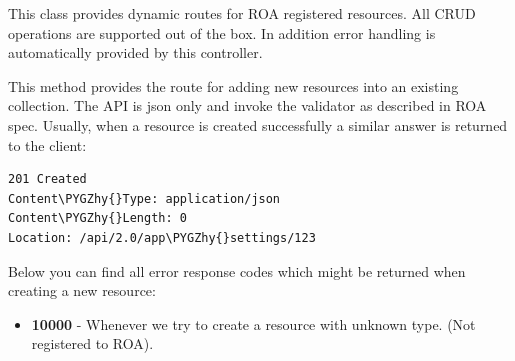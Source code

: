 \documentclass[letterpaper,10pt,english]{sphinxmanual}
\def\PYGZhy{\char`\-}
\begin{document}
\begin{fulllineitems}
\begin{fulllineitems}
\end{fulllineitems}


\end{fulllineitems}


\begin{fulllineitems}
\label{features/roa/technical_summary:fantastico.contrib.roa_discovery.roa_controller.RoaController}
This class provides dynamic routes for ROA registered resources. All CRUD operations are supported out of the box. In
addition error handling is automatically provided by this controller.

\begin{fulllineitems}
\label{features/roa/technical_summary:fantastico.contrib.roa_discovery.roa_controller.RoaController.create_item}
This method provides the route for adding new resources into an existing collection. The API is json only and invoke
the validator as described in ROA spec. Usually, when a resource is created successfully a similar answer is returned to
the client:

\begin{Verbatim}[commandchars=\\\{\}]
201 Created
Content\PYGZhy{}Type: application/json
Content\PYGZhy{}Length: 0
Location: /api/2.0/app\PYGZhy{}settings/123
\end{Verbatim}

Below you can find all error response codes which might be returned when creating a new resource:
\begin{itemize}
\item {} 
\textbf{10000} - Whenever we try to create a resource with unknown type. (Not registered to ROA).


\end{itemize}
\end{fulllineitems}
\end{fulllineitems}
\end{document}
